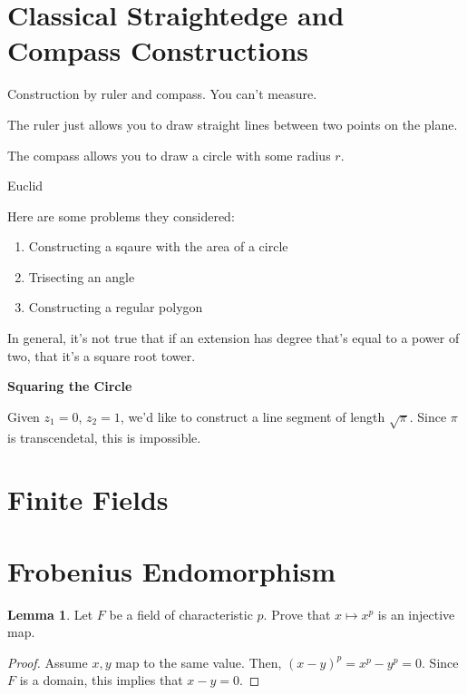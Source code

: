 \documentclass{article}
\theoremstyle{definition}
\newtheorem{lemma}[theorem]{Lemma}
\begin{document}
\newpage

\section{Classical Straightedge and Compass Constructions}


Construction by ruler and compass. You can't measure.

The ruler just allows you to draw straight lines between two points on the plane.

The compass allows you to draw a circle with some radius $r$.

Euclid

Here are some problems they considered:
\begin{enumerate}
    \item Constructing a sqaure with the area of a circle
    \item Trisecting an angle
    \item Constructing a regular polygon
\end{enumerate}

In general, it's not true that if an extension has degree that's equal to a power of two,
that it's a square root tower.

\textbf{Squaring the Circle}

Given $z_{1} = 0$, $z_{2} = 1$, we'd like to construct a line segment of length $\sqrt{\pi}$.
Since $\pi$ is transcendetal, this is impossible.

\newpage

\section{Finite Fields}

\newpage

\section{Frobenius Endomorphism}

\begin{lemma}
    Let $F$ be a field of characteristic $p$. Prove that $x \mapsto x^{p}$ is an injective map.
\end{lemma}
\begin{proof}
    Assume $x,y$ map to the same value. Then, $(x-y)^{p} = x^{p} - y^{p} = 0$.
    Since $F$ is a domain, this implies that $x - y = 0$.
\end{proof}
\end{document}
